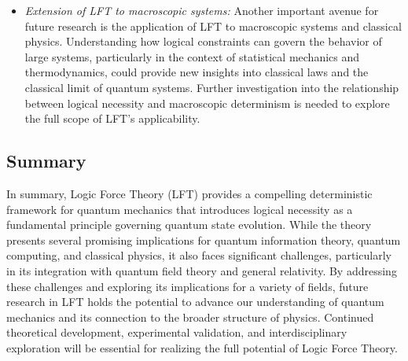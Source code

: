 \begin{itemize}
    \item \textit{Extension of LFT to macroscopic systems:} Another important avenue for future research is the application of LFT to macroscopic systems and classical physics. Understanding how logical constraints can govern the behavior of large systems, particularly in the context of statistical mechanics and thermodynamics, could provide new insights into classical laws and the classical limit of quantum systems. Further investigation into the relationship between logical necessity and macroscopic determinism is needed to explore the full scope of LFT’s applicability.
\end{itemize}

\subsection{Summary}

In summary, Logic Force Theory (LFT) provides a compelling deterministic framework for quantum mechanics that introduces logical necessity as a fundamental principle governing quantum state evolution. While the theory presents several promising implications for quantum information theory, quantum computing, and classical physics, it also faces significant challenges, particularly in its integration with quantum field theory and general relativity. By addressing these challenges and exploring its implications for a variety of fields, future research in LFT holds the potential to advance our understanding of quantum mechanics and its connection to the broader structure of physics. Continued theoretical development, experimental validation, and interdisciplinary exploration will be essential for realizing the full potential of Logic Force Theory.